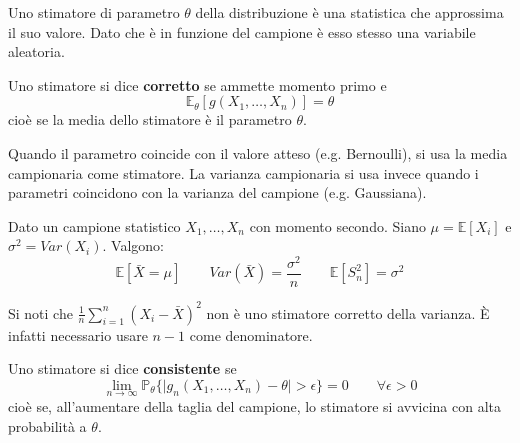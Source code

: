 \begin{definition}[Stimatore]
	Uno stimatore di parametro $\theta$ della distribuzione è una statistica che approssima il suo valore. Dato che è in funzione del campione è esso stesso una variabile aleatoria. 
\end{definition}

\begin{definition}
	Uno stimatore si dice \textbf{corretto} se ammette momento primo e
	\begin{equation}
		\mathbb{E}_\theta[g(X_1, \ldots, X_n)] = \theta
	\end{equation}
	cioè se la media dello stimatore è il parametro $\theta$.
\end{definition}

\begin{observation}
	Quando il parametro coincide con il valore atteso (e.g. Bernoulli), si usa la media campionaria come stimatore. La varianza campionaria si usa invece quando i parametri coincidono con la varianza del campione (e.g. Gaussiana).
\end{observation}

\begin{proposition}
	Dato un campione statistico $X_1, \ldots, X_n$ con momento secondo. Siano $\mu = \mathbb{E}[X_i]$ e $\sigma^2 = Var(X_i)$. Valgono:
	\begin{equation}
		\mathbb{E}[\bar{X} = \mu] \quad\quad Var(\bar{X})=\frac{\sigma^2}{n} \quad\quad \mathbb{E}[S^2_n]=\sigma^2
	\end{equation}
\end{proposition}

\begin{observation}
	Si noti che $\frac{1}{n} \sum_{i=1}^{n}(X_i - \bar{X})^2$ non è uno stimatore corretto della varianza. È infatti necessario usare $n-1$ come denominatore.
\end{observation}

\begin{definition}
	Uno stimatore si dice \textbf{consistente} se
	\begin{equation}
		\lim_{n \to \infty} \mathbb{P}_\theta \{\lvert g_n(X_1, \ldots, X_n) - \theta \rvert > \epsilon\} = 0 \quad\quad \forall \epsilon > 0
	\end{equation}
	cioè se, all'aumentare della taglia del campione, lo stimatore si avvicina con alta probabilità a $\theta$.
\end{definition}

